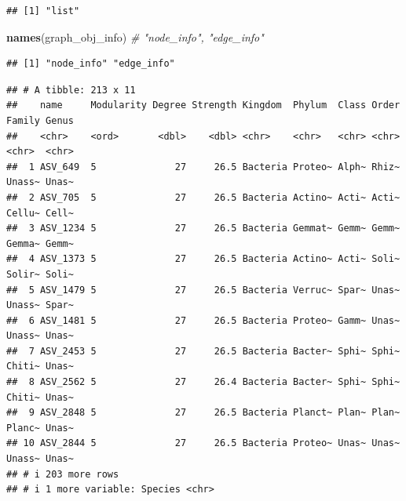 \documentclass[
]{book}
\newenvironment{Shaded}{\begin{snugshade}}{\end{snugshade}}
\newcommand{\CommentTok}[1]{\textcolor[rgb]{0.56,0.35,0.01}{\textit{#1}}}
\newcommand{\FunctionTok}[1]{\textcolor[rgb]{0.13,0.29,0.53}{\textbf{#1}}}
\newcommand{\NormalTok}[1]{#1}
\newcommand{\SpecialCharTok}[1]{\textcolor[rgb]{0.81,0.36,0.00}{\textbf{#1}}}
\begin{document}
\begin{verbatim}
## [1] "list"
\end{verbatim}

\begin{Shaded}
\begin{Highlighting}[]
\FunctionTok{names}\NormalTok{(graph\_obj\_info)         }\CommentTok{\# "node\_info", "edge\_info"}
\end{Highlighting}
\end{Shaded}

\begin{verbatim}
## [1] "node_info" "edge_info"
\end{verbatim}

\begin{Shaded}
\end{Shaded}

\begin{verbatim}
## # A tibble: 213 x 11
##    name     Modularity Degree Strength Kingdom  Phylum  Class Order Family Genus
##    <chr>    <ord>       <dbl>    <dbl> <chr>    <chr>   <chr> <chr> <chr>  <chr>
##  1 ASV_649  5              27     26.5 Bacteria Proteo~ Alph~ Rhiz~ Unass~ Unas~
##  2 ASV_705  5              27     26.5 Bacteria Actino~ Acti~ Acti~ Cellu~ Cell~
##  3 ASV_1234 5              27     26.5 Bacteria Gemmat~ Gemm~ Gemm~ Gemma~ Gemm~
##  4 ASV_1373 5              27     26.5 Bacteria Actino~ Acti~ Soli~ Solir~ Soli~
##  5 ASV_1479 5              27     26.5 Bacteria Verruc~ Spar~ Unas~ Unass~ Spar~
##  6 ASV_1481 5              27     26.5 Bacteria Proteo~ Gamm~ Unas~ Unass~ Unas~
##  7 ASV_2453 5              27     26.5 Bacteria Bacter~ Sphi~ Sphi~ Chiti~ Unas~
##  8 ASV_2562 5              27     26.4 Bacteria Bacter~ Sphi~ Sphi~ Chiti~ Unas~
##  9 ASV_2848 5              27     26.5 Bacteria Planct~ Plan~ Plan~ Planc~ Unas~
## 10 ASV_2844 5              27     26.5 Bacteria Proteo~ Unas~ Unas~ Unass~ Unas~
## # i 203 more rows
## # i 1 more variable: Species <chr>
\end{verbatim}

\begin{Shaded}
\end{Shaded}
\end{document}
